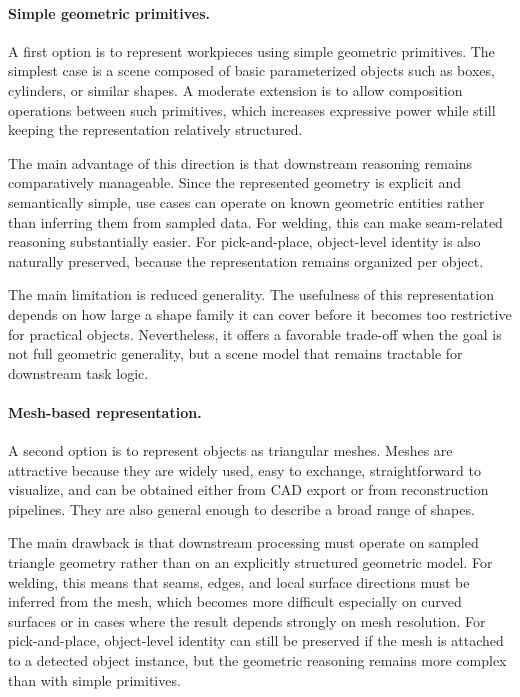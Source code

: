 \paragraph{Simple geometric primitives.}
A first option is to represent workpieces using simple geometric primitives. The simplest case is a scene composed of basic parameterized objects such as boxes, cylinders, or similar shapes. A moderate extension is to allow composition operations between such primitives, which increases expressive power while still keeping the representation relatively structured.

The main advantage of this direction is that downstream reasoning remains comparatively manageable. Since the represented geometry is explicit and semantically simple, use cases can operate on known geometric entities rather than inferring them from sampled data. For welding, this can make seam-related reasoning substantially easier. For pick-and-place, object-level identity is also naturally preserved, because the representation remains organized per object.

The main limitation is reduced generality. The usefulness of this representation depends on how large a shape family it can cover before it becomes too restrictive for practical objects. Nevertheless, it offers a favorable trade-off when the goal is not full geometric generality, but a scene model that remains tractable for downstream task logic.

\paragraph{Mesh-based representation.}
A second option is to represent objects as triangular meshes. Meshes are attractive because they are widely used, easy to exchange, straightforward to visualize, and can be obtained either from CAD export or from reconstruction pipelines. They are also general enough to describe a broad range of shapes.

The main drawback is that downstream processing must operate on sampled triangle geometry rather than on an explicitly structured geometric model. For welding, this means that seams, edges, and local surface directions must be inferred from the mesh, which becomes more difficult especially on curved surfaces or in cases where the result depends strongly on mesh resolution. For pick-and-place, object-level identity can still be preserved if the mesh is attached to a detected object instance, but the geometric reasoning remains more complex than with simple primitives.

